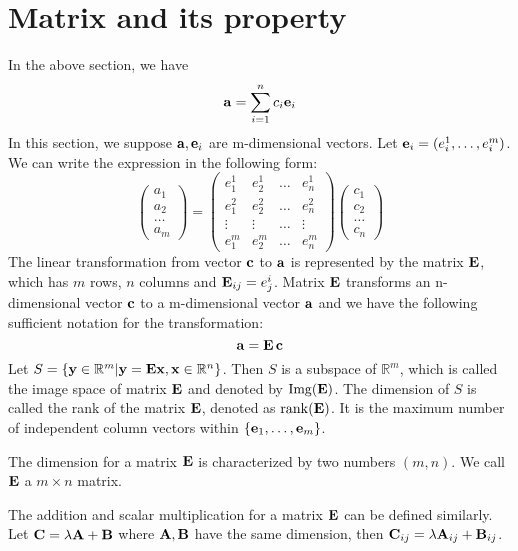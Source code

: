 \section{Matrix and its property}
In the above section, we have 
\begin{equation}
\mathbf{a} = \sum_{i=1}^n c_i \mathbf{e}_i
\end{equation}
In this section, we suppose $\mathbf{a}, \mathbf{e}_i$ are m-dimensional vectors. Let $\mathbf{e}_i = (e_i^1, \dots, e_i^m)$. We can write the expression in the following form:
\begin{equation}
	\begin{pmatrix} a_1 \\ a_2 \\ \dots \\ a_m \end{pmatrix}
	 = \begin{pmatrix} e^1_1 & e^1_2 & \dots & e^1_n \\ e^2_1 & e^2_2 & \dots & e^2_n \\ 
	 	\vdots & \vdots & \dots & \vdots \\
	 	 e^m_1 & e^m_2 & \dots & e^m_n \end{pmatrix} \begin{pmatrix} c_1 \\ c_2 \\ \dots \\ c_n \end{pmatrix}
\end{equation}
The linear transformation from vector $\mathbf{c}$ to $\mathbf{a}$ is represented by the matrix $\mathbf{E}$, which has $m$ rows, $n$ columns and $\mathbf{E}_{ij} = e^i_j$.
Matrix $\mathbf{E}$ transforms an n-dimensional vector $\mathbf{c}$ to a m-dimensional vector $\mathbf{a}$ and 
we have the following sufficient notation for the transformation:
\begin{equation}
\mathbf{a} = \mathbf{E}\, \mathbf{c}
\end{equation}
Let $S=\{\mathbf{y} \in \mathbb{R}^m | \mathbf{y} = \mathbf{E}\mathbf{x}, \mathbf{x} \in \mathbb{R}^n\}$. Then $S$ is a subspace of $\mathbb{R}^m$, which is called the image space of matrix $\mathbf{E}$ and denoted by $\mathrm{Img}(\mathbf{E})$. The dimension of $S$ is called the rank of the matrix $\mathbf{E}$, denoted as $\mathrm{rank}(\mathbf{E})$. It is the maximum number of independent column vectors within $\{\mathbf{e}_1, \dots, \mathbf{e}_m\}$.

The dimension for a matrix $\mathbf{E}$ is characterized by two numbers $(m,n)$. We call $\mathbf{E}$  a $m\times n$ matrix.

The addition and scalar multiplication for a matrix $\mathbf{E}$ can be defined similarly. Let $\mathbf{C} = \lambda \mathbf{A} + \mathbf{B}$ where $\mathbf{A}, \mathbf{B}$ have the same dimension, then $\mathbf{C}_{ij} = \lambda \mathbf{A}_{ij} + \mathbf{B}_{ij}$.

